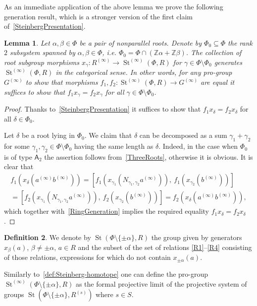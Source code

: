 \documentclass[oneside, 11pt]{amsart}
\numberwithin{equation}{section}
\newtheorem{lemma}{Lemma} \numberwithin{lemma}{section}
\theoremstyle{definition}
\newtheorem{df}[lemma]{Definition} \Crefname{df}{Definition}{Definitions}
\theoremstyle{remark}
\DeclareMathOperator\St{St}
\newcommand{\ZZ}{\mathbb{Z}}
\newcommand{\rA}{\mathsf{A}}
\begin{document}
As an immediate application of the above lemma we prove the following generation result, which is a stronger version of the first claim of~\cref{SteinbergPresentation}.
 \begin{lemma}\label{DoubleRootElimination}  
  Let $\alpha, \beta \in \Phi$ be a pair of nonparallel roots. Denote by \(\Phi_0 \subseteq \Phi\) the rank \(2\) subsystem spanned by $\alpha, \beta \in \Phi$, i.e. \(\Phi_0 = \Phi \cap (\ZZ\alpha + \ZZ\beta)\). The collection of root subgroup morphisms $x_\gamma \colon R^{(\infty)} \to \St^{(\infty)}(\Phi, R)$ for $\gamma \in \Phi\setminus \Phi_0$ generates $\St^{(\infty)}(\Phi, R)$ in the categorical sense. In other words, for any pro-group $G^{(\infty)}$ to show that morphisms $f_1, f_2 \colon \St^{(\infty)}(\Phi, R) \to G^{(\infty)}$ are equal it suffices to show that $f_1x_\gamma = f_2x_\gamma$ for all $\gamma \in \Phi\setminus\Phi_0$.
 \end{lemma}
 \begin{proof}
  Thanks to~\cref{SteinbergPresentation} it suffices to show that $f_1 x_\delta = f_2 x_\delta$ for all $\delta \in \Phi_0$.
  
  Let $\delta$ be a root lying in $\Phi_0$. We claim that $\delta$ can be decomposed as a sum $\gamma_1 + \gamma_2$ for some $\gamma_1,\gamma_2 \in \Phi\setminus\Phi_0$ having the same length as $\delta$. Indeed, in the case when \(\Phi_0\) is of type \(\rA_2\) the assertion follows from~\cref{ThreeRoots}, otherwise it is obvious.  
  It is clear that
  \begin{multline*} f_1(x_\delta(a^{(\infty)}b^{(\infty)})) = [f_1(x_{\gamma_1}(N_{\gamma_1, \gamma_2}a^{(\infty)})),\ f_1(x_{\gamma_2}(b^{(\infty)}))] \\
  = [f_2(x_{\gamma_1}(N_{\gamma_1, \gamma_2}a^{(\infty)})),\ f_2(x_{\gamma_2}(b^{(\infty)}))] = f_2(x_\delta(a^{(\infty)}b^{(\infty)})), \end{multline*}
  which together with~\cref{RingGeneration} implies the required equality $f_1 x_\delta = f_2 x_\delta$.
 \end{proof}

\begin{df}
We denote by $\St(\Phi\setminus\{\pm \alpha\}, R)$ the group given by generators $x_\beta(a)$, $\beta \neq \pm \alpha$, $a\in R$ and the subset of the set of relations \eqref{R1}--\eqref{R4} consisting of those relations, expressions for which do not contain $x_{\pm\alpha}(a)$.

Similarly to~\cref{def:Steinberg-homotope} one can define the pro-group $\St^{(\infty)}(\Phi \setminus\{\pm \alpha\}, R)$ as
the formal projective limit of the projective system of groups $\St(\Phi\setminus\{\pm \alpha\}, R^{(s)})$ where $s\in S$.
\end{df}
\end{document}
